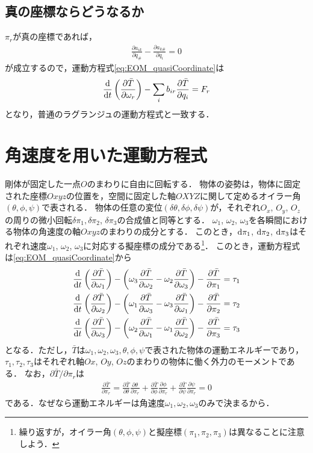 \documentclass[a4j,10pt]{jsarticle}
\newcommand{\bbn}[2]{\frac{{\rm {\rm d}} #1}{{\rm {\rm d}} #2}}
\newcommand{\henbbn}[2]{\frac{\partial #1}{\partial #2}}
\begin{document}
\subsection*{真の座標ならどうなるか}
$\pi_r$が真の座標であれば，
\begin{align*}
    \henbbn{a_{ik}}{q_\#} - \henbbn{a_{k\#}}{q_i} = 0
\end{align*}
が成立するので，運動方程式\eqref{eq:EOM_quasiCoordinate}は
\begin{align}
    \bbn{}{t}\left(\henbbn{\bar{T}}{\omega_r}\right) - \sum_i b_{ir}\henbbn{\bar{T}}{q_i}=F_r
\end{align}
となり，普通のラグランジュの運動方程式と一致する．

\section{角速度を用いた運動方程式}
剛体が固定した一点$O$のまわりに自由に回転する．
物体の姿勢は，物体に固定された座標$Oxyz$の位置を，空間に固定した軸$OXYZ$に関して定めるオイラー角$(\theta, \phi, \psi)$で表される．
物体の任意の変位$(\delta\theta, \delta\phi, \delta\psi)$が，それぞれ$O_x$, $O_y$, $O_z$の周りの微小回転$\delta\pi_1, \delta\pi_2$, $\delta\pi_3$の合成値と同等とする．
$\omega_1$, $\omega_2$, $\omega_3$を各瞬間における物体の角速度の軸$Oxyz$のまわりの成分とする．
このとき，${\rm d}\pi_1$, ${\rm d}\pi_2$, ${\rm d}\pi_3$はそれぞれ速度$\omega_1$, $\omega_2$, $\omega_3$に対応する擬座標の成分である\footnote{繰り返すが，オイラー角$(\theta, \phi, \psi)$と擬座標$(\pi_1, \pi_2, \pi_3)$は異なることに注意しよう．}．
このとき，運動方程式は\eqref{eq:EOM_quasiCoordinate}から
\begin{subequations}
    \begin{align}
        \bbn{}{t}\left(\henbbn{\bar{T}}{\omega_1}\right) - \left(\omega_3\henbbn{\bar{T}}{\omega_2}- \omega_2\henbbn{\bar{T}}{\omega_3}\right)- \henbbn{\bar{T}}{\pi_1} = \tau_1\\
        \bbn{}{t}\left(\henbbn{\bar{T}}{\omega_2}\right) - \left(\omega_1\henbbn{\bar{T}}{\omega_3}- \omega_3\henbbn{\bar{T}}{\omega_1}\right)- \henbbn{\bar{T}}{\pi_2} = \tau_2\\
        \bbn{}{t}\left(\henbbn{\bar{T}}{\omega_3}\right) - \left(\omega_2\henbbn{\bar{T}}{\omega_1}- \omega_1\henbbn{\bar{T}}{\omega_2}\right)- \henbbn{\bar{T}}{\pi_3} = \tau_3
    \end{align}
\end{subequations}
となる．ただし，$\bar{T}$は$\omega_1, \omega_2, \omega_3, \theta, \phi, \psi$で表された物体の運動エネルギーであり，
$\tau_1, \tau_2, \tau_3$はそれぞれ軸$Ox$, $Oy$, $Oz$のまわりの物体に働く外力のモーメントである．
なお，$\partial \bar{T}/\partial\pi_r$は
\begin{align*}
    \henbbn{\bar{T}}{\pi_r} = \henbbn{\bar{T}}{\theta}\henbbn{\theta}{\pi_r} + \henbbn{\bar{T}}{\phi}\henbbn{\phi}{\pi_r} +\henbbn{\bar{T}}{\psi}\henbbn{\psi}{\pi_r}=0
\end{align*}
である．なぜなら運動エネルギーは角速度$\omega_1, \omega_2, \omega_3$のみで決まるから．
\end{document}
